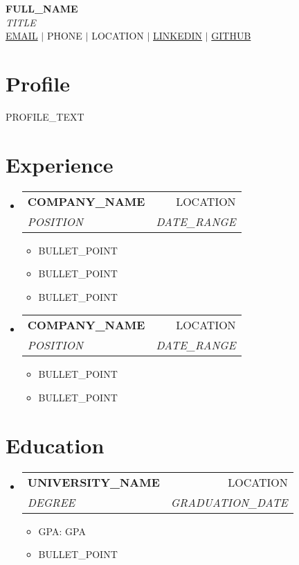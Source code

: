\documentclass[letterpaper,10pt]{article}
\makeatletter
\newcommand{\resumeItem}[1]{
  \item\small{#1}
}
\newcommand{\resumeSubheading}[4]{
  \vspace{1pt}
  \item
    \begin{tabular*}{0.97\textwidth}[t]{l@{\extracolsep{\fill}}r}
      \textbf{#1} & #2 \\
      \textit{#3} & \textit{#4} \\
    \end{tabular*}\vspace{1pt}
}
\makeatother
\begin{document}
\begin{center}
    {\Large \textbf{{FULL\_NAME}}} \\
    \vspace{2pt}
    {\small \textit{{TITLE}}} \\
    \vspace{4pt}
    \small
     \href{mailto:{EMAIL}}{{EMAIL}} $|$ 
     {PHONE} $|$ 
     {LOCATION} $|$ 
     \href{https://linkedin.com/in/{LINKEDIN}}{{LINKEDIN}} $|$ 
     \href{https://github.com/{GITHUB}}{{GITHUB}}
\end{center}

\section{Profile}
\justify
{\small {PROFILE\_TEXT}}

\section{Experience}
\begin{itemize}[leftmargin=0.15in, label={}, itemsep=2pt]
    \resumeSubheading
      {COMPANY\_NAME}{LOCATION}
      {POSITION}{DATE\_RANGE}
      \begin{itemize}[leftmargin=0.15in, label=\textbullet, itemsep=0pt]
        \resumeItem{BULLET\_POINT}
        \resumeItem{BULLET\_POINT}
        \resumeItem{BULLET\_POINT}
      \end{itemize}
    
    \resumeSubheading
      {COMPANY\_NAME}{LOCATION}
      {POSITION}{DATE\_RANGE}
      \begin{itemize}[leftmargin=0.15in, label=\textbullet, itemsep=0pt]
        \resumeItem{BULLET\_POINT}
        \resumeItem{BULLET\_POINT}
      \end{itemize}
\end{itemize}

\section{Education}
\begin{itemize}[leftmargin=0.15in, label={}, itemsep=2pt]
    \resumeSubheading
      {UNIVERSITY\_NAME}{LOCATION}
      {DEGREE}{GRADUATION\_DATE}
      \begin{itemize}[leftmargin=0.15in, label=\textbullet, itemsep=0pt]
        \resumeItem{GPA: {GPA}}
        \resumeItem{BULLET\_POINT}
      \end{itemize}
\end{itemize}
\end{document}
